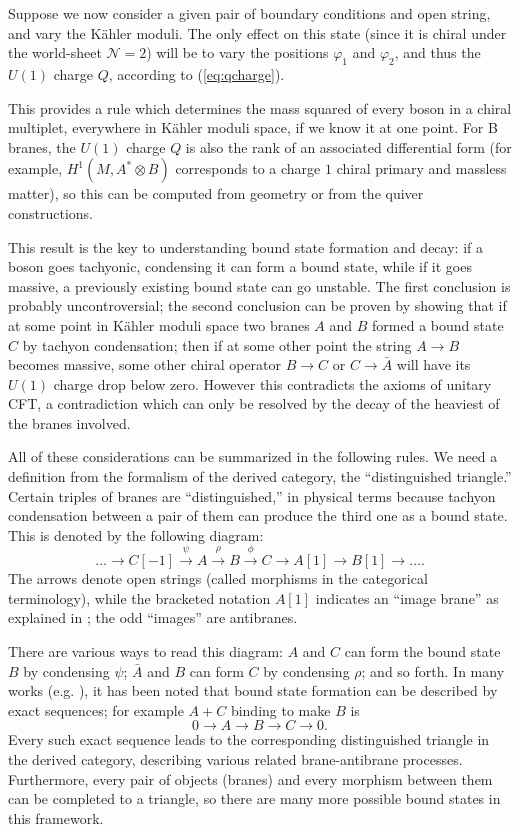 \documentclass[a4paper,12pt]{amsart}
\numberwithin{equation}{section}
\theoremstyle{plain}
\theoremstyle{definition}
\def\mapr{\mathop{\longrightarrow}\limits}
\def\grade{\varphi}
\def\cal{\mathcal}
\def\CN{{\cal N}}
\begin{document}
Suppose we now consider a given pair of boundary conditions and open
string, and vary the K\"ahler moduli.  The only effect on this state
(since it is chiral under the world-sheet $\CN=2$) will be to vary
the positions $\grade_1$ and $\grade_2$, and thus the $U(1)$ charge $Q$,
according to (\ref{eq:qcharge}).  

This provides a rule which determines the mass squared of every boson
in a chiral multiplet, everywhere in K\"ahler moduli space, if we know
it at one point.  For B branes, the $U(1)$ charge $Q$ is also the rank
of an associated differential form (for example, $H^1(M,A^*\otimes B)$
corresponds to a charge $1$ chiral primary and massless matter), so this
can be computed from geometry or from the quiver constructions.

This result is the key to understanding bound state formation and
decay: if a boson goes tachyonic, condensing it can form a bound
state, while if it goes massive, a previously existing bound state can
go unstable.  The first conclusion is probably uncontroversial; the
second conclusion can be proven by showing that if at some point in
K\"ahler moduli space two branes $A$ and $B$ formed a bound state $C$
by tachyon condensation; then if at some other point the string
$A\rightarrow B$ becomes massive, some other chiral operator
$B\rightarrow C$ or $C\rightarrow \bar A$ will have its $U(1)$ charge
drop below zero.  However this contradicts the axioms of unitary CFT,
a contradiction which can only be resolved by the decay of the heaviest
of the branes involved.

All of these considerations can be summarized in the following rules.
We need a definition from the formalism of the derived category, the
``distinguished triangle.''  Certain triples of branes are ``distinguished,''
in physical terms because tachyon condensation between a pair of them can
produce the third one as a bound state.  This is denoted by the following
diagram:
\begin{equation} \label{eq:disttri}
\ldots\mapr C[-1]\mapr^\psi A\mapr^\rho B\mapr^\phi C
\mapr A[1] \mapr B[1] \mapr \ldots .
\end{equation}
The arrows denote open strings (called morphisms in the categorical
terminology), while the bracketed notation $A[1]$ indicates an ``image
brane'' as explained in \cite{DCS}; the odd ``images'' are antibranes.

There are various ways to read this diagram: $A$ and $C$ can form the
bound state $B$ by condensing $\psi$; $\bar A$ and $B$ can form $C$ by
condensing $\rho$; and so forth.
In many works (e.g. \cite{HarveyMoore}), it has been noted that bound
state formation can be described by exact sequences; for example $A +
C$ binding to make $B$ is
\begin{equation}
0 \mapr A\mapr B\mapr C \mapr 0 .
\end{equation}
Every such exact sequence leads to the corresponding distinguished
triangle in the derived category, describing various related
brane-antibrane processes.  Furthermore, every pair of objects
(branes) and every morphism between them can be completed to a
triangle, so there are many more possible bound states in this
framework.
\end{document}
